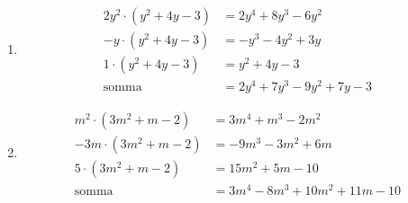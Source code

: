 \begin{question}[ID=1.5, subtitle={Prodotti e riduzione di polinomi di secondo grado}, tags={prodotti, polinomi}, difficulty=difficile]
\begin{explanation}
\begin{enumerate}
\[\begin{aligned}
    \end{aligned}\]
    \item \[\begin{aligned}
    2y^2\cdot(y^2+4y-3) &= 2y^4+8y^3-6y^2\\
    -y\cdot(y^2+4y-3) &= -y^3-4y^2+3y\\
    1\cdot(y^2+4y-3) &= y^2+4y-3\\
    \text{somma} &= 2y^4+7y^3-9y^2+7y-3
    \end{aligned}\]
    \item \[\begin{aligned}
    m^2\cdot(3m^2+m-2) &= 3m^4+m^3-2m^2\\
    -3m\cdot(3m^2+m-2) &= -9m^3-3m^2+6m\\
    5\cdot(3m^2+m-2) &= 15m^2+5m-10\\
    \text{somma} &= 3m^4-8m^3+10m^2+11m-10
    \end{aligned}\]
\end{enumerate}
\end{explanation}
\end{question}

